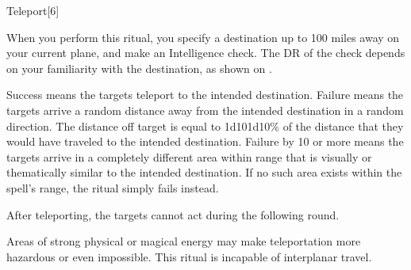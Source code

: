 \begin{spellsection}{Teleport}[6]
    \begin{spellheader}
    \end{spellheader}
    \begin{spellcontent}
        \begin{spelltargetinginfo}
        \end{spelltargetinginfo}
        \begin{spelleffects}
            \spelleffect When you perform this ritual, you specify a destination up to 100 miles away on your current plane, and make an Intelligence check. The DR of the check depends on your familiarity with the destination, as shown on .

            Success means the targets teleport to the intended destination. Failure means the targets arrive a random distance away from the intended destination in a random direction. The distance off target is equal to 1d10\mult1d10\% of the distance that they would have traveled to the intended destination. Failure by 10 or more means the targets arrive in a completely different area within range that is visually or thematically similar to the intended destination. If no such area exists within the spell's range, the ritual simply fails instead.

            After teleporting, the targets cannot act during the following round.
        \end{spelleffects}
    \end{spellcontent}
    \begin{spellfooter}
        \spellnotes Areas of strong physical or magical energy may make teleportation more hazardous or even impossible. This ritual is incapable of interplanar travel.
    \end{spellfooter}
    \begin{spellaugments}
    \end{spellaugments}
\end{spellsection}

